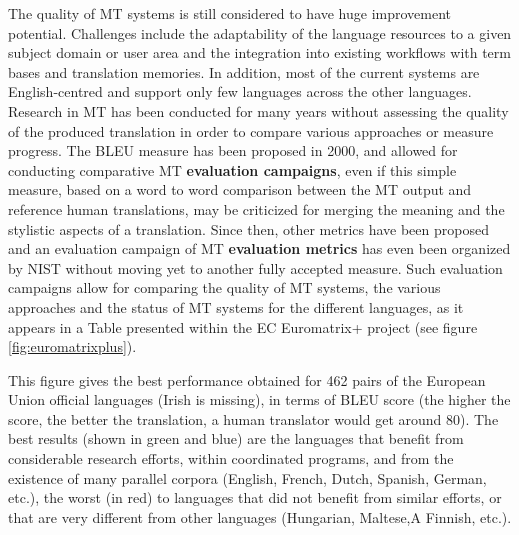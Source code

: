 \begin{multicols}{2}
The quality of MT systems is still considered to have huge improvement
potential. Challenges include the adaptability of the language
resources to a given subject domain or user area and the integration
into existing workflows with term bases and translation memories. In
addition, most of the current systems are English-centred and support
only few languages across the other languages. Research in MT has been
conducted for many years without assessing the quality of the produced
translation in order to compare various approaches or measure
progress. The BLEU measure has been proposed in 2000\cite{bleu02}, and allowed for
conducting comparative MT {\bf evaluation campaigns}, even if this simple
measure, based on a word to word comparison between the MT output and
reference human translations, may be criticized for merging the
meaning and the stylistic aspects of a translation. Since then, other
metrics have been proposed and an evaluation campaign of MT {\bf evaluation
metrics} has even been organized by NIST without moving yet to another
fully accepted measure. Such evaluation campaigns allow for comparing
the quality of MT systems, the various approaches and the status of MT
systems for the different languages, as it appears in a Table
presented within the EC Euromatrix+ project (see figure \ref{fig:euromatrixplus}).


This figure gives the best performance obtained for 462 pairs of the
European Union official languages (Irish is missing), in terms of BLEU
score (the higher the score, the better the translation, a human
translator would get around 80). The best results (shown in green and
blue) are the languages that benefit from considerable research
efforts, within coordinated programs, and from the existence of many
parallel corpora (English, French, Dutch, Spanish, German, etc.), the
worst (in red) to languages that did not benefit from similar efforts,
or that are very different from other languages (Hungarian, Maltese,A
Finnish, etc.).


\end{multicols}
